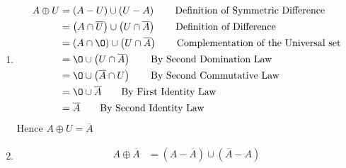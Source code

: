 \documentclass[12pt letter]{report}
\begin{document}
{\begin{enumerate}
\begin{align*}
			                  & = \left( A \right) \cup \left( \O \cap \overline{A} \right) \tag*{By First Identity Law}             \\
			                  & = A \cup \left( \overline{A} \cap \O \right) \tag*{By Second Commutative Law}                        \\
			                  & = A \cup \O \tag*{By Second Domination Law}                                                          \\
			                  & = A \tag*{By Second Identity Law}                                                                    \\
		      \end{align*}
		      Hence $A \oplus \O = A$
		\item
		      \begin{align*}
			      A \oplus U & = \left( A - U \right) \cup \left( U - A \right) \tag*{Definition of Symmetric Difference}       \\
			                 & = \left( A \cap \overline{U} \right) \cup \left( U \cap \overline{A} \right) \tag*{Definition of
			      Difference}                                                                                                   \\
			                 & = \left( A \cap \O \right) \cup \left( U \cap \overline{A} \right) \tag*{Complementation of the
			      Universal set}                                                                                                \\
			                 & = \O \cup \left( U \cap \overline{A} \right) \tag*{By Second Domination Law }                    \\
			                 & = \O \cup \left( \overline{A} \cap U  \right) \tag*{By Second Commutative Law}                   \\
			                 & = \O \cup \overline{A} \tag*{By First Identity Law}                                              \\
			                 & = \overline{A} \tag*{By Second Identity Law}                                                     \\
		      \end{align*}
		      Hence $A \oplus U = \overline{A}$
		\item
		      \begin{align*}
			      A \oplus \overline{A} & = \left( A - \overline{A} \right) \cup \left( \overline{A} - A \right)
			      \tag*{Definition of Symmetric Difference}                                                                                     \\

\end{align*}
\end{enumerate}}
\end{document}

